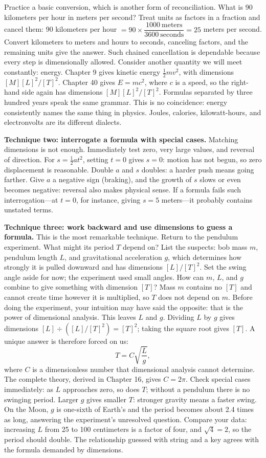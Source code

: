 Practice a basic conversion, which is another form of reconciliation. What is 90 kilometers per hour in meters per second? Treat units as factors in a fraction and cancel them: 90 kilometers per hour $= 90 \times \dfrac{1000\ \text{meters}}{3600\ \text{seconds}} = 25$ meters per second. Convert kilometers to meters and hours to seconds, canceling factors, and the remaining units give the answer. Such chained cancellation is dependable because every step is dimensionally allowed. Consider another quantity we will meet constantly: energy. Chapter 9 gives kinetic energy $\frac{1}{2}mv^2$, with dimensions $[M][L]^2/[T]^2$. Chapter 40 gives $E = mc^2$, where $c$ is a speed, so the right-hand side again has dimensions $[M][L]^2/[T]^2$. Formulas separated by three hundred years speak the same grammar. This is no coincidence: energy consistently names the same thing in physics. Joules, calories, kilowatt-hours, and electronvolts are its different dialects.

\textbf{Technique two: interrogate a formula with special cases.} Matching dimensions is not enough. Immediately test zero, very large values, and reversal of direction. For $s = \frac{1}{2} a t^2$, setting $t = 0$ gives $s = 0$: motion has not begun, so zero displacement is reasonable. Double $a$ and $s$ doubles: a harder push means going farther. Give $a$ a negative sign (braking), and the growth of $s$ slows or even becomes negative: reversal also makes physical sense. If a formula fails such interrogation---at $t = 0$, for instance, giving $s = 5$ meters---it probably contains unstated terms.

\textbf{Technique three: work backward and use dimensions to guess a formula.} This is the most remarkable technique. Return to the pendulum experiment. What might its period $T$ depend on? List the suspects: bob mass $m$, pendulum length $L$, and gravitational acceleration $g$, which determines how strongly it is pulled downward and has dimensions $[L]/[T]^2$. Set the swing angle aside for now; the experiment used small angles. How can $m$, $L$, and $g$ combine to give something with dimension $[T]$? Mass $m$ contains no $[T]$ and cannot create time however it is multiplied, so $T$ does not depend on $m$. Before doing the experiment, your intuition may have said the opposite: that is the power of dimensional analysis. This leaves $L$ and $g$. Dividing $L$ by $g$ gives dimensions $[L] \div ([L]/[T]^2) = [T]^2$; taking the square root gives $[T]$. A unique answer is therefore forced on us:
\[
T = C\sqrt{\frac{L}{g}},
\]
where $C$ is a dimensionless number that dimensional analysis cannot determine. The complete theory, derived in Chapter 16, gives $C = 2\pi$. Check special cases immediately: as $L$ approaches zero, so does $T$; without a pendulum there is no swinging period. Larger $g$ gives smaller $T$: stronger gravity means a faster swing. On the Moon, $g$ is one-sixth of Earth's and the period becomes about 2.4 times as long, answering the experiment's unresolved question. Compare your data: increasing $L$ from 25 to 100 centimeters is a factor of four, and $\sqrt{4} = 2$, so the period should double. The relationship guessed with string and a key agrees with the formula demanded by dimensions.

